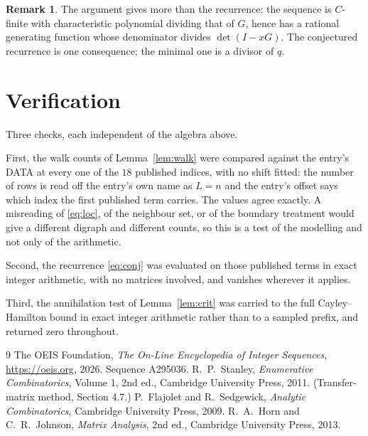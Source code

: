\documentclass[11pt,a4paper]{article}
\theoremstyle{plain}
\theoremstyle{definition}
\newtheorem{remark}[theorem]{Remark}
\begin{document}
\begin{remark}
The argument gives more than the recurrence: the sequence is $C$-finite with characteristic
polynomial dividing that of $G$, hence has a rational generating function whose denominator
divides $\det(I-xG)$. The conjectured recurrence is one consequence; the minimal one is a
divisor of $q$.
\end{remark}

\section{Verification}

Three checks, each independent of the algebra above.

First, the walk counts of Lemma~\ref{lem:walk} were compared against the entry's DATA at
every one of the $18$ published indices, with no shift fitted: the number of rows is
read off the entry's own name as $L=n$ and the entry's offset says which index the first
published term carries. The values agree exactly. A misreading of \eqref{eq:loc}, of the
neighbour set, or of the boundary treatment would give a different digraph and different
counts, so this is a test of the modelling and not only of the arithmetic.

Second, the recurrence \eqref{eq:conj} was evaluated on those published terms in exact
integer arithmetic, with no matrices involved, and vanishes wherever it applies.

Third, the annihilation test of Lemma~\ref{lem:crit} was carried to the full
Cayley--Hamilton bound in exact integer arithmetic rather than to a sampled prefix, and
returned zero throughout.

\begin{thebibliography}{9}
 The OEIS Foundation, \emph{The On-Line Encyclopedia of Integer
Sequences}, \url{https://oeis.org}, 2026. Sequence A295036.
 R.~P.~Stanley, \emph{Enumerative Combinatorics}, Volume 1, 2nd ed.,
Cambridge University Press, 2011. (Transfer-matrix method, Section 4.7.)
 P.~Flajolet and R.~Sedgewick, \emph{Analytic Combinatorics}, Cambridge
University Press, 2009.
 R.~A.~Horn and C.~R.~Johnson, \emph{Matrix Analysis}, 2nd ed., Cambridge
University Press, 2013.
\end{thebibliography}
\end{document}
